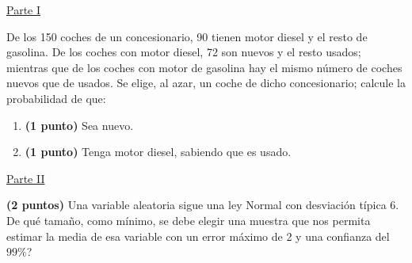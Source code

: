 
\noindent\underline{Parte I}

De los 150 coches de un concesionario, 90 tienen motor diesel y el resto de gasolina. De los coches con motor diesel, 72 son nuevos y el resto usados; mientras que de los coches con motor de gasolina hay el mismo número de coches nuevos que de usados. Se elige, al azar, un coche de dicho concesionario; calcule la probabilidad de que:
\begin{enumerate}[label=\alph*)]
\item \textbf{(1 punto)} Sea nuevo.
\item \textbf{(1 punto)} Tenga motor diesel, sabiendo que es usado.
\end{enumerate}
\par\noindent\begin{minipage}{\linewidth}
\noindent\underline{Parte II}

\textbf{(2 puntos)} Una variable aleatoria sigue una ley Normal con desviación típica 6. \textquestiondown{}De qué tamaño, como mínimo, se debe elegir una muestra que nos permita estimar la media de esa variable con un error máximo de 2 y una confianza del $99\%$?
\end{minipage}\par
